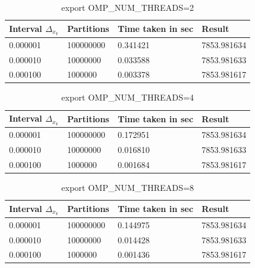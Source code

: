 		\begin{table}[h]
			\caption{export OMP\_NUM\_THREADS=2}
			\begin{center}
				\begin{tabular}{|l|l|l|l|}
					\hline
					Interval $\Delta_{x_k}$  &  Partitions  &  Time taken in sec &  Result \\
					\hline
					0.000001  &  100000000  &  0.341421  &  7853.981634 \\
					\hline
					0.000010  &  10000000  &  0.033588  &  7853.981633 \\
					\hline
					0.000100  &  1000000  &  0.003378  &  7853.981617 \\
					\hline
				\end{tabular}
			\end{center}
		\end{table}
		
		\begin{table}[h]
			\caption{export OMP\_NUM\_THREADS=4}
			\begin{center}
				\begin{tabular}{|l|l|l|l|}
					\hline
					Interval $\Delta_{x_k}$  &  Partitions  &  Time taken in sec &  Result \\
					\hline
					0.000001  &  100000000  &  0.172951  &  7853.981634 \\
					\hline
					0.000010  &  10000000  &  0.016810  &  7853.981633 \\
					\hline
					0.000100  &  1000000  &  0.001684  &  7853.981617 \\
					\hline
				\end{tabular}
			\end{center}
		\end{table}
			
		\begin{table}[h]
			\caption{export OMP\_NUM\_THREADS=8}
			\begin{center}
				\begin{tabular}{|l|l|l|l|}
					\hline
					Interval $\Delta_{x_k}$  &  Partitions  &  Time taken in sec &  Result \\
					\hline
					0.000001  &  100000000  &  0.144975  &  7853.981634 \\
					\hline
					0.000010  &  10000000  &  0.014428  &  7853.981633 \\
					\hline
					0.000100  &  1000000  &  0.001436  &  7853.981617 \\
					\hline
				\end{tabular}
			\end{center}
		\end{table}


